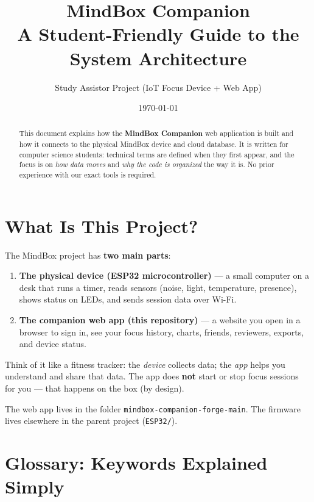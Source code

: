 \documentclass[11pt,a4paper]{article}
\title{\textbf{MindBox Companion}\\[0.4em]
\large A Student-Friendly Guide to the System Architecture}
\author{Study Assistor Project (IoT Focus Device + Web App)}
\date{\today}
\newcommand{\filepath}[1]{\texttt{#1}}
\begin{document}
\maketitle

\begin{abstract}
This document explains how the \textbf{MindBox Companion} web application is built and how it connects to the physical MindBox device and cloud database. It is written for computer science students: technical terms are defined when they first appear, and the focus is on \emph{how data moves} and \emph{why the code is organized} the way it is. No prior experience with our exact tools is required.
\end{abstract}

\tableofcontents
\newpage

\section{What Is This Project?}

The MindBox project has \textbf{two main parts}:

\begin{enumerate}[leftmargin=*]
  \item \textbf{The physical device (ESP32 microcontroller)} --- a small computer on a desk that runs a timer, reads sensors (noise, light, temperature, presence), shows status on LEDs, and sends session data over Wi-Fi.
  \item \textbf{The companion web app (this repository)} --- a website you open in a browser to sign in, see your focus history, charts, friends, reviewers, exports, and device status.
\end{enumerate}

Think of it like a fitness tracker: the \emph{device} collects data; the \emph{app} helps you understand and share that data. The app does \textbf{not} start or stop focus sessions for you --- that happens on the box (by design).

The web app lives in the folder \filepath{mindbox-companion-forge-main}. The firmware lives elsewhere in the parent project (\filepath{ESP32/}).

\section{Glossary: Keywords Explained Simply}
\end{document}
